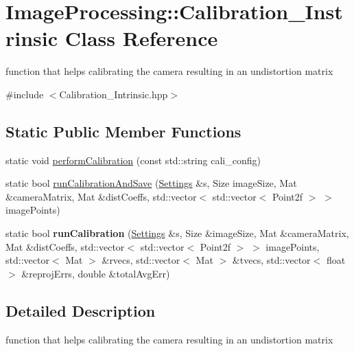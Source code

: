 \hypertarget{class_image_processing_1_1_calibration___instrinsic}{}\section{Image\+Processing\+:\+:Calibration\+\_\+\+Instrinsic Class Reference}
\label{class_image_processing_1_1_calibration___instrinsic}


function that helps calibrating the camera resulting in an undistortion matrix  




{\ttfamily \#include $<$Calibration\+\_\+\+Intrinsic.\+hpp$>$}

\subsection*{Static Public Member Functions}
\begin{DoxyCompactItemize}
\item 
static void \mbox{\hyperlink{class_image_processing_1_1_calibration___instrinsic_acbaa653aac61aa9fc42696a51267b6b8}{perform\+Calibration}} (const std\+::string cali\+\_\+config)
\item 
static bool \mbox{\hyperlink{class_image_processing_1_1_calibration___instrinsic_a69ec772ab65d6fc5918a39b5e5839e2e}{run\+Calibration\+And\+Save}} (\mbox{\hyperlink{class_settings}{Settings}} \&s, Size image\+Size, Mat \&camera\+Matrix, Mat \&dist\+Coeffs, std\+::vector$<$ std\+::vector$<$ Point2f $>$ $>$ image\+Points)
\item 
\mbox{\label{class_image_processing_1_1_calibration___instrinsic_ad38f84410a98a93ed3c2078f06210880}} 
static bool {\bfseries run\+Calibration} (\mbox{\hyperlink{class_settings}{Settings}} \&s, Size \&image\+Size, Mat \&camera\+Matrix, Mat \&dist\+Coeffs, std\+::vector$<$ std\+::vector$<$ Point2f $>$ $>$ image\+Points, std\+::vector$<$ Mat $>$ \&rvecs, std\+::vector$<$ Mat $>$ \&tvecs, std\+::vector$<$ float $>$ \&reproj\+Errs, double \&total\+Avg\+Err)
\end{DoxyCompactItemize}


\subsection{Detailed Description}
function that helps calibrating the camera resulting in an undistortion matrix 


